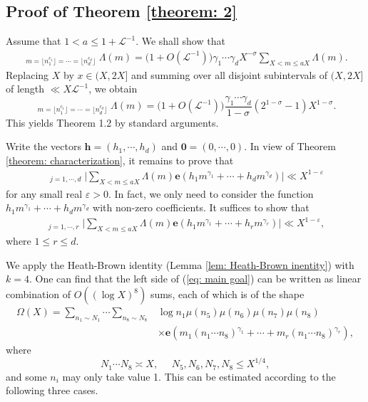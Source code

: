 \documentclass[12pt, reqno, twoside, letterpaper]{amsart}
\numberwithin{equation}{section}
\theoremstyle{customthm}
\theoremstyle{customrem}
\begin{document}
\subsection{Proof of Theorem \ref{theorem: 2}}\label{subsection: proof of intersection}


Assume that $1<a\leqslant 1+\mathcal{L}^{-1}$. We shall show that
\begin{align*}
\mathop{\sum_{X< m\leqslant aX}}_{m=\lfloor n_1^{c_1}\rfloor=\cdots=\lfloor n_d^{c_d}\rfloor}\Lambda(m)
=\big(1+O(\mathcal{L}^{-1})\big)\gamma_1\cdots\gamma_d X^{-\sigma}
\sum_{X<m\leqslant aX}\Lambda(m).
\end{align*}
Replacing $X$ by $x\in(X,2X]$ and summing over all disjoint subintervals of $(X,2X]$
of length $\ll X\mathcal{L}^{-1}$, we obtain
$$
\mathop{\sum_{X< m\leqslant 2X}}_{m=\lfloor n_1^{c_1}\rfloor=\cdots=\lfloor n_d^{c_d}\rfloor}\Lambda(m)
=\big(1+O(\mathcal{L}^{-1})\big)\frac{\gamma_1\cdots\gamma_d}{1-\sigma}
(2^{1-\sigma}-1)X^{1-\sigma}.
$$
This yields Theorem 1.2 by standard arguments.



Write the vectors $\boldsymbol{h}=(h_1,\cdots,h_d)$ and $\boldsymbol{0}=(0,\cdots,0)$.
In view of Theorem \ref{theorem: characterization}, it remains to prove that
\begin{align*}
\mathop{\mathop{\sum_{\boldsymbol{h}\in\mathbb{Z}^d\setminus\{\boldsymbol{0}\}}
}_{|h_j|<X^{\delta_j}\mathcal{L}}}_{j=1,\cdots,d}
\Bigg|\sum_{X<m\leqslant aX}\Lambda(m)
\mathbf{e}\left(h_1m^{\gamma_1}+\cdots+h_dm^{\gamma_d}\right)\Bigg|
	\ll X^{1-\varepsilon}
\end{align*}
for any small real $\varepsilon>0$.
In fact, we only need to consider the function $h_1m^{\gamma_1}+\cdots+h_dm^{\gamma_d}$
with non-zero coefficients. It suffices to show that
\begin{align}\label{eq: main goal}
\mathop{\sum_{0<|h_j|<X^{\delta_j}\mathcal{L}}}_{j=1,\cdots,r}
\Bigg|\sum_{X < m \leqslant aX}\Lambda(m)
\mathbf{e}\left(h_1m^{\gamma_1}+\cdots+h_rm^{\gamma_r}\right)\Bigg|
\ll X^{1-\varepsilon},
\end{align}
where $1\leqslant r\leqslant d$.


We apply the Heath-Brown identity (Lemma \ref{lem: Heath-Brown inentity})
with $k=4$. One can find that the left side of (\ref{eq: main goal}) can be written as
linear combination of $O\left((\log X)^8\right)$ sums, each of which is of the shape
\begin{align*}
\Omega(X)=\sum_{n_1\sim N_1}\cdots\sum_{n_8\sim N_8}
&\log n_1\mu(n_5)\mu(n_6)\mu(n_7)\mu(n_8)\\
&\times\mathbf{e}\left(m_1(n_1\cdots n_8)^{\gamma_1}+\cdots+m_r(n_1\cdots n_8)^{\gamma_r}\right),
\end{align*}
where
$$
N_1\cdots N_8\asymp X,\ \ \ \ \ \ N_5,N_6,N_7,N_8\leqslant X^{1/4},
$$
and some $n_i$ may only take value 1. This can be estimated according to
the following three cases.
\end{document}
